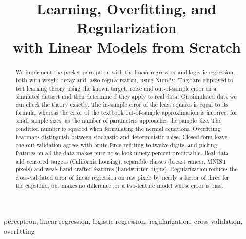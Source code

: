\documentclass[conference]{IEEEtran}
\begin{document}
\title{Learning, Overfitting, and Regularization\\with Linear Models from Scratch}

\author{
\and
{}
}

\maketitle

\begin{abstract}
We implement the pocket perceptron with the linear regression and logistic regression, both with weight decay and lasso regularization, using NumPy. They are employed to test learning theory using the known target, noise and out-of-sample error on a simulated dataset and then determine if they apply to real data. On simulated data we can check the theory exactly. The in-sample error of the least squares is equal to its formula, whereas the error of the textbook out-of-sample approximation is incorrect for small sample sizes, as the number of parameters approaches the sample size. The condition number is squared when formulating the normal equations. Overfitting heatmaps distinguish between stochastic and deterministic noise. Closed-form leave-one-out validation agrees with brute-force refitting to twelve digits, and picking features on all the data makes pure noise look ninety percent predictable. Real data add censored targets (California housing), separable classes (breast cancer, MNIST pixels) and weak hand-crafted features (handwritten digits). Regularization reduces the cross-validated error of linear regression on raw pixels by nearly a factor of three for the capstone, but makes no difference for a two-feature model whose error is bias.
\end{abstract}

\begin{IEEEkeywords}
perceptron, linear regression, logistic regression, regularization, cross-validation, overfitting
\end{IEEEkeywords}
\end{document}
